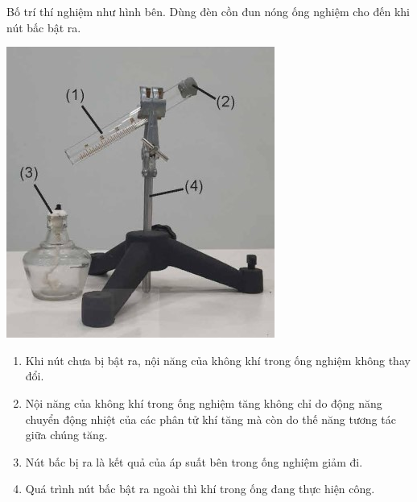 \begin{ex}
	Bố trí thí nghiệm như hình bên. Dùng đèn cồn đun nóng ống nghiệm cho đến khi nút bấc bật ra.
	\begin{center}
		\includegraphics[width=0.3\linewidth]{figs/VN12-Y24-PH-SYL-003P-5}
	\end{center}
	\begin{enumerate}[label=\alph*)]
		\item Khi nút chưa bị bật ra, nội năng của không khí trong ống nghiệm không thay đổi.
		\item Nội năng của không khí trong ống nghiệm tăng không chỉ do động năng chuyển động nhiệt của các phân tử khí tăng mà còn do thế năng tương tác giữa chúng tăng.
		\item Nút bấc bị ra là kết quả của áp suất bên trong ống nghiệm giảm đi.
		\item Quá trình nút bấc bật ra ngoài thì khí trong ống đang thực hiện công.
	\end{enumerate}
	\end{ex}


